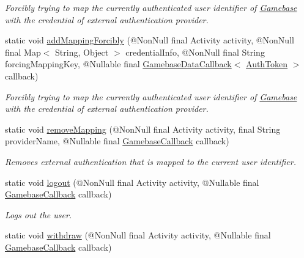 \begin{DoxyCompactItemize}
\begin{DoxyCompactList}\small\item\em Forcibly trying to map the currently authenticated user identifier of \hyperlink{classcom_1_1toast_1_1android_1_1gamebase_1_1_gamebase}{Gamebase} with the credential of external authentication provider. \end{DoxyCompactList}\item 
static void \hyperlink{classcom_1_1toast_1_1android_1_1gamebase_1_1_gamebase_aad7e2e23e0143342ba53d5c9158d4c7b}{add\+Mapping\+Forcibly} (@Non\+Null final Activity activity, @Non\+Null final Map$<$ String, Object $>$ credential\+Info, @Non\+Null final String forcing\+Mapping\+Key, @Nullable final \hyperlink{interfacecom_1_1toast_1_1android_1_1gamebase_1_1_gamebase_data_callback}{Gamebase\+Data\+Callback}$<$ \hyperlink{classcom_1_1toast_1_1android_1_1gamebase_1_1auth_1_1data_1_1_auth_token}{Auth\+Token} $>$ callback)
\begin{DoxyCompactList}\small\item\em Forcibly trying to map the currently authenticated user identifier of \hyperlink{classcom_1_1toast_1_1android_1_1gamebase_1_1_gamebase}{Gamebase} with the credential of external authentication provider. \end{DoxyCompactList}\item 
static void \hyperlink{classcom_1_1toast_1_1android_1_1gamebase_1_1_gamebase_a0349c553fad7eb3fb4bdd0da8cebe311}{remove\+Mapping} (@Non\+Null final Activity activity, final String provider\+Name, @Nullable final \hyperlink{interfacecom_1_1toast_1_1android_1_1gamebase_1_1_gamebase_callback}{Gamebase\+Callback} callback)
\begin{DoxyCompactList}\small\item\em Removes external authentication that is mapped to the current user identifier. \end{DoxyCompactList}\item 
static void \hyperlink{classcom_1_1toast_1_1android_1_1gamebase_1_1_gamebase_a46e0cbaa0ed64f4c0eb66e137bfcf4d4}{logout} (@Non\+Null final Activity activity, @Nullable final \hyperlink{interfacecom_1_1toast_1_1android_1_1gamebase_1_1_gamebase_callback}{Gamebase\+Callback} callback)
\begin{DoxyCompactList}\small\item\em Logs out the user. \end{DoxyCompactList}\item 
static void \hyperlink{classcom_1_1toast_1_1android_1_1gamebase_1_1_gamebase_aaa0ce688f5b145c64fb3cc3ec7d496c7}{withdraw} (@Non\+Null final Activity activity, @Nullable final \hyperlink{interfacecom_1_1toast_1_1android_1_1gamebase_1_1_gamebase_callback}{Gamebase\+Callback} callback)

\end{DoxyCompactItemize}
